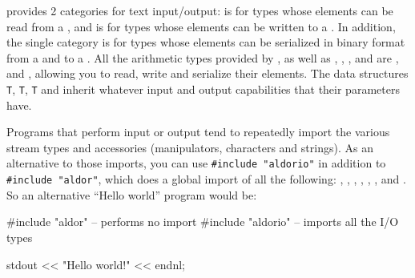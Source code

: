 \libaldor{} provides 2 categories for text input/output: 
is for types whose elements can be read from a ,
and  is for types whose elements can be written
to a . In addition, the single category
 is for types whose elements can be serialized
in binary format from a  and to a .
All the arithmetic types provided by \libaldor, as well as ,
, ,  and
are ,  and ,
allowing you to read, write and serialize their elements. The data structures
 {\tt T},  {\tt T},  {\tt T}
and  inherit whatever input
and output capabilities that their parameters have.

Programs that perform input or output tend to repeatedly import 
the various stream types and accessories (manipulators, characters and
strings). As an alternative to those imports,
you can use {\tt \#include "aldorio"} in
addition to {\tt \#include "aldor"}, which does a global import of
all the following: , , ,
, , ,
 and
.
So an alternative ``Hello world'' program would be:
\begin{ttyout}
#include "aldor"                              -- performs no import
#include "aldorio"                            -- imports all the I/O types

stdout << "Hello world!" << endnl;
\end{ttyout}

